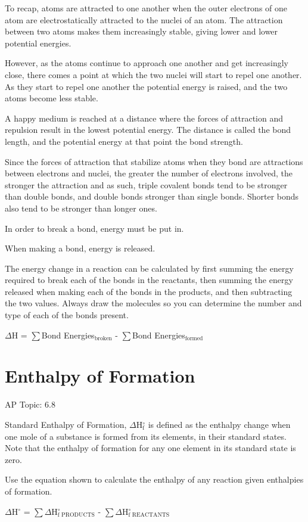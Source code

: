 \documentclass[../chem.tex]{subfiles}
\begin{document}
To recap, atoms are attracted to one another when the outer electrons of one atom are electrostatically attracted to the nuclei of an atom. The attraction between two atoms makes them increasingly stable, giving lower and lower potential energies.

However, as the atoms continue to approach one another and get increasingly close, there comes a point at which the two nuclei will start to repel one another. As they 
start to repel one another the potential energy is raised, and the two atoms become less stable.

A happy medium is reached at a distance where the forces of attraction and repulsion result in the lowest potential energy. The distance is called the bond length, and the potential energy at that point 
the bond strength.

Since the forces of attraction that stabilize atoms when they bond are attractions between electrons and nuclei, the greater the number of electrons 
involved, the stronger the attraction and as such, triple covalent bonds tend to be stronger than double bonds, and double bonds stronger than single bonds. 
Shorter bonds also tend to be stronger than longer ones.

In order to break a bond, energy must be put in.

When making a bond, energy is released.

The energy change in a reaction can be calculated by first summing the energy required to break each of the bonds in the reactants, then summing the energy released 
when making each of the bonds in the products, and then subtracting the two values. Always draw the molecules so you can determine the number and type of each of the bonds present.
\begin{center}
    $\Delta$H = $\sum$Bond Energies$_{\text{broken}}$ - $\sum$Bond Energies$_{\text{formed}}$
\end{center}

\section{Enthalpy of Formation}
AP Topic: 6.8

Standard Enthalpy of Formation, $\Delta$H$_{\text{f}}^{\circ}$ is defined as the enthalpy change when one mole of a substance is formed from its elements, in their standard states.
Note that the enthalpy of formation for any one element in its standard state is zero.

Use the equation shown to calculate the enthalpy of any reaction given enthalpies of formation.
\begin{center}
    $\Delta$H$^{\circ}$ = $\sum\Delta$H$^{\circ}_{\text{f PRODUCTS}}$ - $\sum\Delta$H$^{\circ}_{\text{f REACTANTS}}$
\end{center}
\end{document}
